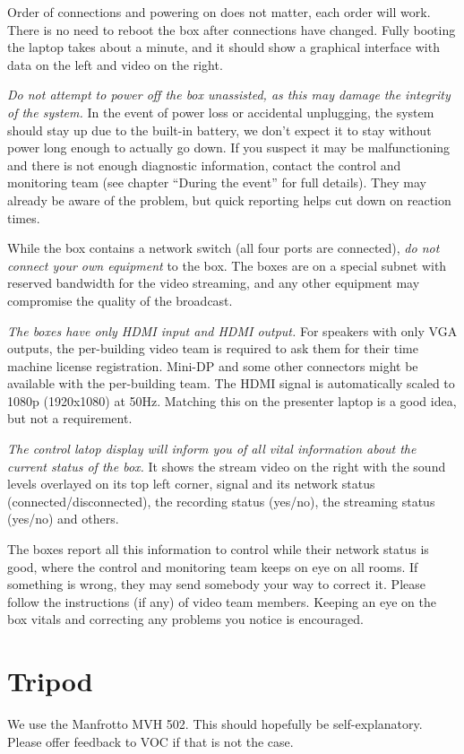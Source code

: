 \documentclass{article}
\begin{document}
Order of connections and powering on does not matter, each order will work. There is no need to reboot the box after connections have changed.
Fully booting the laptop takes about a minute, and it should show a graphical interface with data on the left and video on the right.

\emph{Do not attempt to power off the box unassisted, as this may damage the integrity of the system.}
In the event of power loss or accidental unplugging, the system should stay up due to the built-in battery, we don't expect it to stay without power long enough to actually go down. If you suspect it may be malfunctioning and there is not enough diagnostic information, contact the control and monitoring team (see chapter ``During the event'' for full details). They may already be aware of the problem, but quick reporting helps cut down on reaction times.

While the box contains a network switch (all four ports are connected), \emph{do not connect your own equipment} to the box. The boxes are on a special subnet with reserved bandwidth for the video streaming, and any other equipment may compromise the quality of the broadcast.

\emph{The boxes have only HDMI input and HDMI output.}
For speakers with only VGA outputs, the per-building video team is required to ask them for their time machine license registration. Mini-DP and some other connectors might be available with the per-building team.
The HDMI signal is automatically scaled to 1080p (1920x1080) at 50Hz. Matching this on the presenter laptop is a good idea, but not a requirement.

\emph{The control latop display will inform you of all vital information about the current status of the box.} It shows the stream video on the right with the sound levels overlayed on its top left corner, signal and its network status (connected/disconnected), the recording status (yes/no), the streaming status (yes/no) and others.

The boxes report all this information to control while their network status is good, where the control and monitoring team keeps on eye on all rooms. If something is wrong, they may send somebody your way to correct it. Please follow the instructions (if any) of video team members. Keeping an eye on the box vitals and correcting any problems you notice is encouraged.

\section{Tripod}
We use the Manfrotto MVH 502. This should hopefully be self-explanatory. Please offer feedback to VOC if that is not the case.
\end{document}
